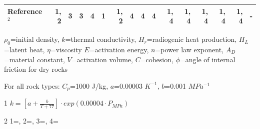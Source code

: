 \documentclass[draft]{assets/agujournal2019}
\begin{document}
\begin{table}
\begin{threeparttable}
\begin{tabularx}{\textwidth}{L{2.75} R{0.5} R{0.5} R{0.5} R{0.5} R{0.5} R{1.5} R{0.5} R{0.5} R{0.5} R{0.5} R{0.75} R{0.75} R{0.75} R{0.5} R{0.75}}
   \midrule

   Reference$^2$             & 1, 2             & 3                                     & 3     & 4                   & 1               & 1, 2           & 4            & 4           & 4                & 1, 4  & 1, 4                  & 1, 4               & 1, 4        & 1, 4   & -          \\

   \bottomrule
  \end{tabularx}
  \begin{tablenotes}
   \footnotesize
   \item[] $\rho_0$=initial density, $k$=thermal conductivity, $H_r$=radiogenic heat production, $H_L$=latent heat, $\eta$=viscosity $E$=activation energy, $n$=power law exponent, $A_D$=material constant, $V$=activation volume, $C$=cohesion, $\phi$=angle of internal friction for dry rocks
   \item [] For all rock types: $C_p$=1000 J/kg, $a$=\num{0.00003} $K^{-1}$, $b$=\num{0.001} $MPa^{-1}$
   \item [1] $k = [a+\frac{b}{T+77}]\cdot exp(\num{0.00004}\cdot P_{MPa})$
   \item [2] 1=, 2=, 3=, 4=
  \end{tablenotes}
 \end{threeparttable}
\end{table}
\end{document}
